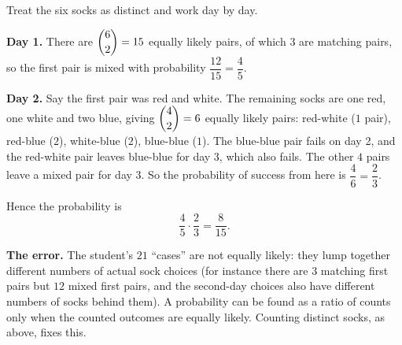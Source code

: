 Treat the six socks as distinct and work day by day.

\textbf{Day 1.} There are $\dbinom62=15$ equally likely pairs, of which $3$ are matching pairs, so the first pair is mixed with probability $\dfrac{12}{15}=\dfrac{4}{5}$.

\textbf{Day 2.} Say the first pair was red and white. The remaining socks are one red, one white and two blue, giving $\dbinom42=6$ equally likely pairs: red-white ($1$ pair), red-blue ($2$), white-blue ($2$), blue-blue ($1$). The blue-blue pair fails on day 2, and the red-white pair leaves blue-blue for day 3, which also fails. The other $4$ pairs leave a mixed pair for day 3. So the probability of success from here is $\dfrac{4}{6}=\dfrac{2}{3}$.

Hence the probability is
\[
\dfrac{4}{5}\cdot\dfrac{2}{3}=\boxed{\dfrac{8}{15}} .
\]

\textbf{The error.} The student's $21$ ``cases'' are not equally likely: they lump together different numbers of actual sock choices (for instance there are $3$ matching first pairs but $12$ mixed first pairs, and the second-day choices also have different numbers of socks behind them). A probability can be found as a ratio of counts only when the counted outcomes are equally likely. Counting distinct socks, as above, fixes this.
